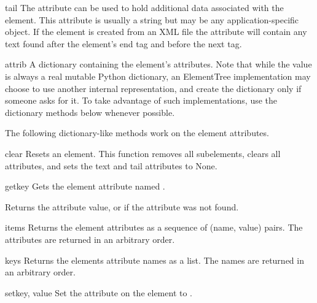\begin{memberdesc}[Element]{tail}
The  attribute can be used to hold additional data
associated with the element.
This attribute is usually a string but may be any application-specific object.
If the element is created from an XML file the attribute will contain
any text found after the element's end tag and before the next tag.
\end{memberdesc}

\begin{memberdesc}[Element]{attrib}
A dictionary containing the element's attributes.
Note that while the  value is always a real mutable Python
dictionary, an ElementTree implementation may choose to use another
internal representation, and create the dictionary only if someone
asks for it. To take advantage of such implementations, use the
dictionary methods below whenever possible.
\end{memberdesc}

The following dictionary-like methods work on the element attributes.

\begin{methoddesc}[Element]{clear}{}
Resets an element.  This function removes all subelements, clears
all attributes, and sets the text and tail attributes to None.
\end{methoddesc}

\begin{methoddesc}[Element]{get}{key}
Gets the element attribute named .

Returns the attribute value, or  if the
attribute was not found.
\end{methoddesc}

\begin{methoddesc}[Element]{items}{}
Returns the element attributes as a sequence of (name, value) pairs.
The attributes are returned in an arbitrary order.
\end{methoddesc}

\begin{methoddesc}[Element]{keys}{}
Returns the elements attribute names as a list.
The names are returned in an arbitrary order.
\end{methoddesc}

\begin{methoddesc}[Element]{set}{key, value}
Set the attribute  on the element to .  
\end{methoddesc}

